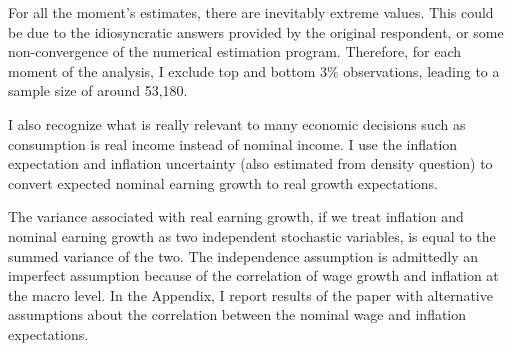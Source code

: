 \begin{comment}
Since subjective moments such as variance is calculated based on the
estimated distribution, it is important to make sure the estimation
assumptions of the density distribution do not mechanically distort my
cross-sectional patterns of the estimated moments. This is the most
obviously seen in the tail risk measure, skewness. The assumption of log
normality of income process, common in the literature (See again
\cite{blundell_consumption_2008}), implicitly assume zero skewness,
i.e.~that the income increase and decrease from its mean are equally
likely. This may not be the case in our surveyed density for many
individuals. In order to account for this possibility, the assumed
density distribution should be flexible enough to allow for different
shapes of subjective distribution. Beta distribution fits this purpose
well. Of course, in the case of uniform and isosceles triangular
distribution, the skewness is zero by default.

Since the microdata provided in the SCE website already includes the
estimated mean, variance and IQR by the staff economists following the
exact same approach, I directly use their estimates for these moments.
At the same time, for the measure of tail-risk, i.e.~skewness, as not
provided, I use my own estimates. I also confirm that my estimates and
theirs for the first two moments are correlated with a coefficient of
0.9.

\end{comment}

For all the moment's estimates, there are inevitably extreme values.
This could be due to the idiosyncratic answers provided by the original
respondent, or some non-convergence of the numerical estimation program.
Therefore, for each moment of the analysis, I exclude top and bottom
\(3\%\) observations, leading to a sample size of around 53,180.

I also recognize what is really relevant to many economic decisions such
as consumption is real income instead of nominal income. I use the inflation expectation and inflation uncertainty (also estimated
from density question) to convert expected nominal earning growth to real
growth expectations.

The variance associated with real earning growth, if we treat inflation
and nominal earning growth as two independent stochastic variables, is
equal to the summed variance of the two. The independence assumption is
admittedly an imperfect assumption because of the correlation of wage
growth and inflation at the macro level. In the Appendix, I report results of the paper with alternative assumptions about the correlation between the nominal wage and inflation expectations.



